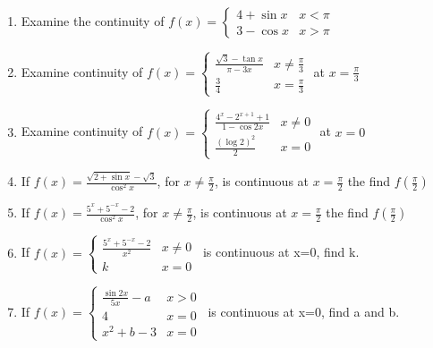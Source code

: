 \documentclass[14pt]{article}
\begin{document}
\begin{multicols}{2}
\begin{enumerate}[resume]
\item Examine the continuity of
$f(x) =  \begin{cases} 
        4+\sin x  & x < \pi \\
        3 - \cos x   &  x > \pi 
   \end{cases}$
   
   
   \item Examine continuity of
$f(x) =  \begin{cases}  
       \frac{\sqrt{3} - \tan x}{\pi-3x} & x\neq \frac{\pi}{3} \\
        \frac{3}{4}                       &  x = \frac{\pi}{3}
   \end{cases}$ at $x = \frac{\pi}{3}$

\item Examine continuity of
$f(x) =  \begin{cases} 
       \frac{4^x - 2^{x+1}+1}{1- \cos 2x} & x\neq 0 \\ 
        \frac{(\log 2)^2}{2}                           &  x = 0
   \end{cases}$ at $ x  = 0$

\item If
$f(x) = 
       \frac{\sqrt{2+\sin x}- \sqrt{3}}{\cos^2x}$, for $x \neq \frac{\pi}{2}$, is continuous at $x = \frac{\pi}{2}$ the find $f(\frac{\pi}{2}) $


\item If
$f(x) =  \frac{5^x+5^{-x}-2}{\cos^2x}$, for $x \neq \frac{\pi}{2}$, is continuous at $x = \frac{\pi}{2}$ the find $f(\frac{\pi}{2}) $

\item If
$f(x) =  \begin{cases} 
       \frac{5^x+5^{-x}-2}{x^2} & x\neq 0 \\
        k                            &  x = 0 
   \end{cases}$\, is continuous at x=0, find k.


\item If
$f(x) =  \begin{cases} 
       \frac{\sin 2x}{5x} - a& x>0 \\
        4                           &  x = 0 \\
        x^2+b-3                &  x = 0 
   \end{cases}$\, is continuous at x=0, find a and b.
  
  \end{enumerate} 
   

\end{multicols}
\end{document}
